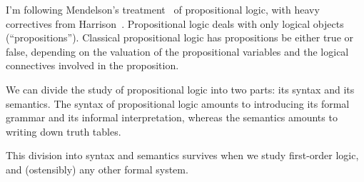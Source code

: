 \begin{node}\label{prop-0000}%
I'm following Mendelson's treatment~\cite{mendelson2015mathematical} of
propositional logic, with heavy correctives from
Harrison~\cite{harrison2009handbook}. Propositional logic deals with
only logical objects (``propositions''). Classical propositional logic
has propositions be either true or false, depending on the valuation of
the propositional variables and the logical connectives involved in the
proposition.
\end{node}

\begin{node}\label{prop-000H}%
We can divide the study of propositional logic into two parts: its
syntax and its semantics. The syntax of propositional logic amounts to
introducing its formal grammar and its informal interpretation, whereas
the semantics amounts to writing down truth tables.

This division into syntax and semantics survives when we study
first-order logic, and (ostensibly) any other formal system.
\end{node}

